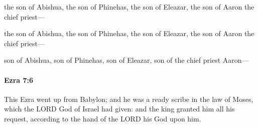 			\begin{versebox}
					\item[BHS] 
					\item[LXX] 
					\item[ASV] the son of Abishua, the son of Phinehas, the son of Eleazar, the son of Aaron the chief priest—
					\item[NIV] the son of Abishua, the son of Phinehas, the son of Eleazar, the son of Aaron the chief priest—
					\item[NRSV] son of Abishua, son of Phinehas, son of Eleazar, son of the chief priest Aaron—
			\end{versebox}

		\paragraph{Ezra 7:6} %
			\label{EZRA-7-6}

			This Ezra went up from Babylon; and he was a ready scribe in the law of Moses, which the LORD God of Israel had given: and the king granted him all his request, according to the hand of the LORD his God upon him.


